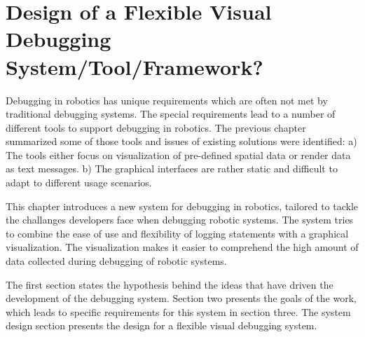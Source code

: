 \chapter{Design of a Flexible Visual Debugging System/Tool/Framework?}
\label{visual_debugging_system}

Debugging in robotics has unique requirements which are often not met by traditional debugging systems. The special requirements lead to a number of different tools to support debugging in robotics. The previous chapter summarized some of those tools and issues of existing solutions were identified: a) The tools either focus on visualization of pre-defined spatial data or render data as text messages. b) The graphical interfaces are rather static and difficult to adapt to different usage scenarios.

This chapter introduces a new system for debugging in robotics, tailored to tackle the challanges developers face when debugging robotic systems. The system tries to combine the ease of use and flexibility of logging statements with a graphical visualization. The visualization makes it easier to comprehend the high amount of data collected during debugging of robotic systems.

The first section states the hypothesis behind the ideas that have driven the development of the debugging system. Section two presents the goals of the work, which leads to specific requirements for this system in section three. The system design section presents the design for a flexible visual debugging system.




